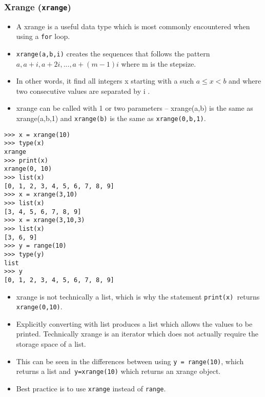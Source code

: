\documentclass[Pydata.tex]{subfiles}
\begin{document}
\subsubsection{Xrange (\texttt{xrange})}
\begin{itemize}
\item A xrange is a useful data type which is most commonly encountered when using a \texttt{for} loop. 
\item 
\texttt{xrange(a,b,i)}
creates the sequences that follows the pattern $a, a +i , a +2i , . . . , a +(m -1)i$ where m is the stepsize.
\item In other
words, it find all integers x starting with a such $a \leq x < b$ and where two consecutive values are separated
by i . \item 
xrange can be called with 1 or two parameters – xrange(a,b) is the same as xrange(a,b,1)
and \texttt{xrange(b)} is the same as \texttt{xrange(0,b,1)}.
\end{itemize}
\begin{framed}
\begin{verbatim}
>>> x = xrange(10)
>>> type(x)
xrange
>>> print(x)
xrange(0, 10)
>>> list(x)
[0, 1, 2, 3, 4, 5, 6, 7, 8, 9]
>>> x = xrange(3,10)
>>> list(x)
[3, 4, 5, 6, 7, 8, 9]
>>> x = xrange(3,10,3)
>>> list(x)
[3, 6, 9]
>>> y = range(10)
>>> type(y)
list
>>> y
[0, 1, 2, 3, 4, 5, 6, 7, 8, 9]
\end{verbatim}
\end{framed}
\begin{itemize}
\item xrange is not technically a list, which is why the statement \texttt{print(x) }returns \texttt{xrange(0,10)}. 
\item Explicitly
converting with list produces a list which allows the values to be printed. Technically xrange is an iterator
which does not actually require the storage space of a list. 
\item This can be seen in the differences between
using \texttt{y = range(10)}, which returns a list and\texttt{ y=xrange(10)} which returns an xrange object. 
\item Best practice
is to use \texttt{xrange} instead of \texttt{range}.
\end{itemize}
\end{document}
